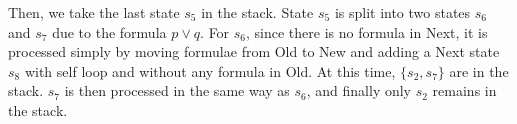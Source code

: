 \documentclass[a4paper,11pt]{article}
\theoremstyle{mytheor}
\begin{document}
\begin{center}
\end{center}

Then, we take the last state $s_5$ in the stack.
State $s_5$ is split into two states $s_6$ and $s_7$ due to the formula $p \lor q$.
For $s_6$, since there is no formula in Next, it is processed simply by moving formulae from Old to New and adding a Next state $s_8$ with self loop  and without any formula in Old. 
At this time, $\{s_2, s_7\}$ are in the stack.
$s_7$ is then processed in the same way as $s_6$, and finally only $s_2$ remains in the stack. 
\end{document}
